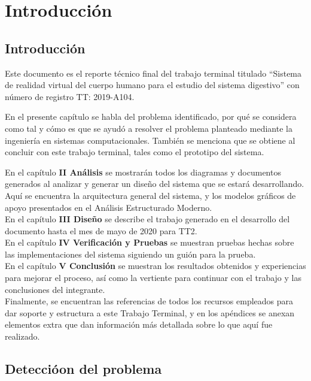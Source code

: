 \chapter{Introducción}

\section{Introducción}

Este documento es el reporte técnico final del trabajo terminal titulado 
“Sistema de realidad virtual del cuerpo humano para el estudio del sistema digestivo” 
con número de registro TT: 2019-A104.

En el presente capítulo se habla del problema identificado, por qué se considera como tal 
y cómo es que se ayudó a resolver el problema planteado mediante la ingeniería 
en sistemas computacionales.
También se menciona que se obtiene al concluir con este trabajo terminal, 
tales como el prototipo del sistema.

En el capítulo \textbf{II Análisis} se mostrarán todos los diagramas y documentos generados al analizar y generar un diseño del sistema que se estará desarrollando. Aquí se encuentra la arquitectura general del sistema, y los modelos gráficos de apoyo presentados en el Análisis Estructurado Moderno.\\
\newline
En el capítulo \textbf{III Diseño} se describe el trabajo generado en el desarrollo del documento hasta el mes de mayo de 2020 para TT2.\\
\newline
En el capítulo \textbf{IV Verificación y Pruebas} se muestran pruebas hechas sobre las implementaciones del sistema siguiendo un guión para la prueba.
 \newline\\
En el capítulo \textbf{V Conclusión} se muestran los resultados obtenidos y experiencias para mejorar el proceso, así como la vertiente para continuar con el trabajo y las conclusiones del integrante.
\newline\\
Finalmente, se encuentran las referencias de todos los recursos empleados para dar soporte y estructura a este Trabajo Terminal, y en los apéndices se anexan elementos extra que dan información más detallada sobre lo que aquí fue realizado.\\
\vfill 

\newpage

\section{Detecci\'oon del problema} 

